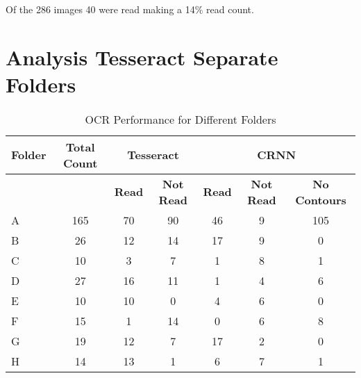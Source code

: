 Of the 286 images 40 were read making a 14\% read count.

\newpage

\section{Analysis Tesseract Separate Folders}

\begin{table}[h]
    \centering
    \caption{OCR Performance for Different Folders}
    \label{tab:ocr_performance}
    \begin{tabular}{|l|c|c|c|c|c|c|}
        \hline
        \textbf{Folder} & \textbf{Total Count} & \multicolumn{2}{c|}{\textbf{Tesseract}} & \multicolumn{3}{c|}{\textbf{CRNN}}                                                            \\
        \hline
                        &                      & \textbf{Read}                           & \textbf{Not Read}                  & \textbf{Read} & \textbf{Not Read} & \textbf{No Contours} \\
        \hline
        A               & 165                  & 70                                      & 90                                 & 46            & 9                 & 105                  \\
        B               & 26                   & 12                                      & 14                                 & 17            & 9                 & 0                    \\
        C               & 10                   & 3                                       & 7                                  & 1             & 8                 & 1                    \\
        D               & 27                   & 16                                      & 11                                 & 1             & 4                 & 6                    \\
        E               & 10                   & 10                                      & 0                                  & 4             & 6                 & 0                    \\
        F               & 15                   & 1                                       & 14                                 & 0             & 6                 & 8                    \\
        G               & 19                   & 12                                      & 7                                  & 17            & 2                 & 0                    \\
        H               & 14                   & 13                                      & 1                                  & 6             & 7                 & 1                    \\
        \hline
    \end{tabular}
\end{table}

